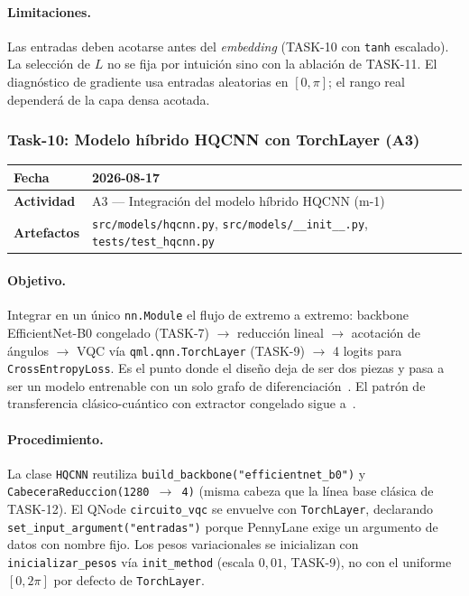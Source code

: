 \paragraph{Limitaciones.}
Las entradas deben acotarse antes del \textit{embedding} (TASK-10 con \texttt{tanh}
escalado). La selección de $L$ no se fija por intuición sino con la ablación de
TASK-11. El diagnóstico de gradiente usa entradas aleatorias en $[0,\pi]$; el rango
real dependerá de la capa densa acotada.

\subsubsection{Task-10: Modelo híbrido HQCNN con TorchLayer (A3)}
\label{hallazgo:task-10}
\begin{tabularx}{\textwidth}{|l|X|}\hline
\textbf{Fecha} & 2026-08-17 \\\hline
\textbf{Actividad} & A3 --- Integración del modelo híbrido HQCNN (m-1) \\\hline
\textbf{Artefactos} & \texttt{src/models/hqcnn.py}, \texttt{src/models/\_\_init\_\_.py}, \texttt{tests/test\_hqcnn.py} \\\hline
\end{tabularx}

\paragraph{Objetivo.}
Integrar en un único \texttt{nn.Module} el flujo de extremo a extremo: backbone
EfficientNet-B0 congelado (TASK-7) $\rightarrow$ reducción lineal $\rightarrow$
acotación de ángulos $\rightarrow$ VQC vía \texttt{qml.qnn.TorchLayer} (TASK-9)
$\rightarrow$ 4 logits para \texttt{CrossEntropyLoss}. Es el punto donde el diseño
deja de ser dos piezas y pasa a ser un modelo entrenable con un solo grafo de
diferenciación~\cite{bergholm2018pennylane,mitarai2018quantum}. El patrón de
transferencia clásico-cuántico con extractor congelado sigue a~\cite{mari2020transfer}.

\paragraph{Procedimiento.}
La clase \texttt{HQCNN} reutiliza \texttt{build\_backbone("efficientnet\_b0")} y
\texttt{CabeceraReduccion(1280 $\rightarrow$ 4)} (misma cabeza que la línea base
clásica de TASK-12). El QNode \texttt{circuito\_vqc} se envuelve con
\texttt{TorchLayer}, declarando \texttt{set\_input\_argument("entradas")} porque
PennyLane exige un argumento de datos con nombre fijo. Los pesos variacionales se
inicializan con \texttt{inicializar\_pesos} vía \texttt{init\_method} (escala
$0{,}01$, TASK-9), no con el uniforme $[0,2\pi]$ por defecto de \texttt{TorchLayer}.

